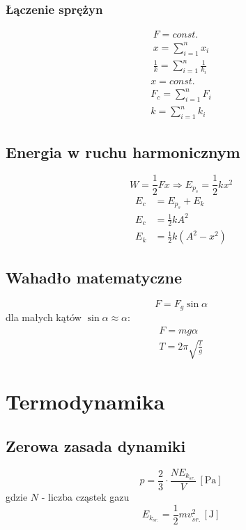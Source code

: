 \documentclass{report}
\numberwithin{equation}{chapter}
\newcommand{\unit}[1]{\,\left[\mathrm{#1}\right]}
\begin{document}
      \subsection{Łączenie sprężyn}
        \begin{gather}
          F = const.\\
          x = \sum_{i=1}^n x_i\\
          \frac{1}{k} = \sum_{i=1}^n \frac{1}{k_i}
        \end{gather}
        \begin{gather}
          x = const.\\
          F_c = \sum_{i=1}^n F_i\\
          k = \sum_{i=1}^n k_i
        \end{gather}
    \section{Energia w ruchu harmonicznym}
      \begin{equation}
        W = \frac{1}{2}Fx \Rightarrow E_{p_s} = \frac{1}{2}kx^2
      \end{equation}
      \begin{align}
        E_c &= E_{p_s} + E_k\\
        E_c &= \frac{1}{2}kA^2\\
        E_k &= \frac{1}{2}k(A^2 - x^2)
      \end{align}
    \section{Wahadło matematyczne}
      \begin{equation}
        F = F_g\sin\alpha
      \end{equation}
      dla małych kątów $\sin\alpha\approx\alpha$:
      \begin{gather}
        F = mg\alpha\\
        T = 2\pi\sqrt{\frac lg}
      \end{gather}

  \newpage
  \chapter{Termodynamika}
    \section{Zerowa zasada dynamiki}
      \begin{equation}
        p = \frac{2}{3}\cdot\frac{NE_{k_{\acute sr.}}}{V} \unit{Pa}
      \end{equation}
      gdzie $N$ - liczba cząstek gazu
      \begin{equation}
        E_{k_{\acute sr.}} = \frac{1}{2}mv_{\acute sr.}^2 \unit{J}
      \end{equation}
\end{document}
